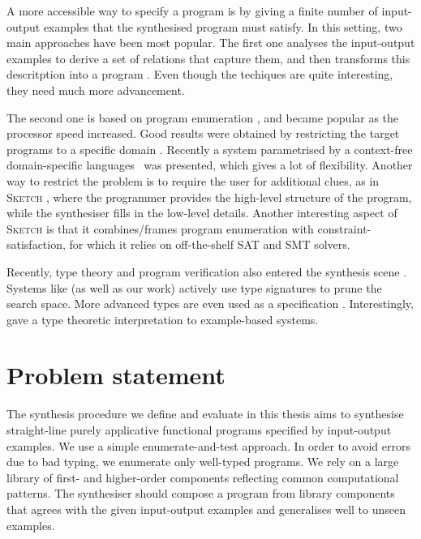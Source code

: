 A more accessible way to specify a program is by giving a finite number of input-output examples that the synthesised program must satisfy.  In this setting, two main approaches have been most popular.  The first one analyses the input-output examples to derive a set of relations that capture them, and then transforms this descritption into a program \cite{Summers:1977:MLP:321992.322002,Kitzelmann:2009:AIF:1530575.1530582,Jha:2010:OCP:1806799.1806833}.  Even though the techiques are quite interesting, they need much more advancement.

The second one is based on program enumeration \cite{LambdaSquarePaper,EscherPaper,MythPaper}, and became popular as the processor speed increased.  Good results were obtained by restricting the target programs to a specific domain \cite{Fischer:2003:ASG:967842.967845,Frigo98fftw:an,Thies2002,Gulwani:2011:ASP:1926385.1926423,Gulwani:2011:SGC:1993498.1993505}. Recently a system parametrised by a context-free domain-specific languages~\cite{Perelman:2014:TS:2594291.2594297} was presented, which gives a lot of flexibility.  Another way to restrict the problem is to require the user for additional clues, as in \textsc{Sketch} \cite{Solar-Lezama:2006:CSF:1168857.1168907}, where the programmer provides the high-level structure of the program, while the synthesiser fills in the low-level details.  Another interesting aspect of \textsc{Sketch} is that it combines/frames program enumeration with constraint-satisfaction, for which it relies on off-the-shelf SAT and SMT solvers.

Recently, type theory and program verification also entered the synthesis scene \cite{LeonPaper,DBLP:journals/corr/InalaQLS15,Kuncak:2010:CFS:1806596.1806632}.  Systems like \cite{LambdaSquarePaper,MythPaper} (as well as our work) actively use type signatures to prune the search space.  More advanced types are even used as a specification \cite{SynquidPaper}.  Interestingly, \cite{Frankle:2016:EST:2837614.2837629} gave a type theoretic interpretation to example-based systems.

\section{Problem statement}\label{Problem}

The synthesis procedure we define and evaluate in this thesis aims to synthesise straight-line purely applicative functional programs specified by input-output examples. We use a simple enumerate-and-test approach. In order to avoid errors due to bad typing, we enumerate only well-typed programs. We rely on a large library of first- and higher-order components reflecting common computational patterns.
The synthesiser should compose a program from library components that agrees with the given input-output examples and generalises well to unseen examples.

